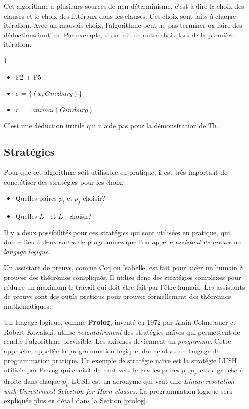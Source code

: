 {Cet algorithme a plusieurs sources de non-déterminisme, c'est-à-dire
le choix des clauses et le choix des littéraux dans les clauses.
Ces choix sont faits à chaque itération.
Avec un mauvais choix, l'algorithme peut ne pas terminer ou
faire des déductions inutiles.
Par exemple, si on fait un autre choix lors de la première itération:

\textbf{\underline{1}}
\begin{itemize}
  \item P2 + P5
  \item $\sigma = \big\{ (x, Ginzburg) \big\}$
  \item $r = \neg animal(Ginzburg)$
\end{itemize}

C'est une déduction inutile qui n'aide pas pour la démonstration de $\mathrm{Th}$.

\subsection{Stratégies}

Pour que cet algorithme soit utilisable en pratique, il est très important
de concrétiser des stratégies pour les choix:
\begin{itemize}
  \item Quelles paires $p_i$ et $p_j$ choisir?
  \item Quelles $L^{+}$ et $L^{-}$ choisir?
\end{itemize}
Il y a deux possibilités pour ces stratégies qui sont utilisées en pratique,
qui donne lieu à deux sortes de programmes que l'on appelle {\em assistant de preuve}
ou {\em langage logique}.

Un assistant de preuve, comme Coq ou Isabelle, est fait pour aider un humain à prouver des théorèmes compliqués.
Il utilise donc des stratégies complexes pour réduire un maximum le travail qui doit
être fait par l'être humain.
Les assistants de preuve sont des outils pratique pour prouver formellement des théorèmes mathématiques.

Un langage logique, comme \textbf{Prolog}, inventé en 1972 par Alain Colmerauer et Robert Kowalski,
utilise {\em volontairement} des stratégies naïves qui permettent de rendre l'algorithme prévisible.
Les axiomes deviennent un {\em programme}.
Cette approche, appellée la programmation logique, donne alors un langage de programmation pratique.
Un exemple de stratégie naïve est la stratégie LUSH utilisée par Prolog
qui choisit de haut vers le bas les paires $p_i, p_j$,
et de gauche à droite dans chaque $p_i$.
LUSH est un acronyme qui veut dire {\em Linear resolution with Unrestricted Selection for Horn clauses}.
La programmation logique sera expliquée plus en détail dans la Section \ref{prolog}.

}
